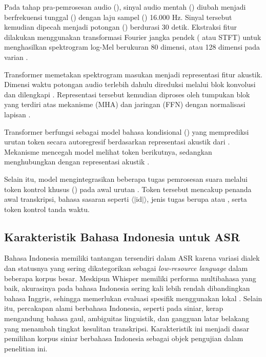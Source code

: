 Pada tahap pra-pemrosesan audio (), sinyal audio mentah () diubah menjadi berfrekuensi tunggal () dengan laju sampel () 16.000 Hz. Sinyal tersebut kemudian dipecah menjadi potongan () berdurasi 30 detik. Ekstraksi fitur dilakukan menggunakan transformasi Fourier jangka pendek ( atau STFT) untuk menghasilkan spektrogram log-Mel berukuran 80 dimensi, atau 128 dimensi pada varian .

 Transformer memetakan spektrogram masukan menjadi representasi fitur akustik. Dimensi waktu potongan audio terlebih dahulu direduksi melalui blok konvolusi dan dilengkapi . Representasi tersebut kemudian diproses oleh tumpukan blok  yang terdiri atas mekanisme  (MHA) dan jaringan  (FFN) dengan normalisasi lapisan .

 Transformer berfungsi sebagai model bahasa kondisional () yang memprediksi urutan token secara autoregresif berdasarkan representasi akustik dari . Mekanisme  mencegah model melihat token berikutnya, sedangkan  menghubungkan  dengan representasi akustik .

Selain itu, model  mengintegrasikan beberapa tugas pemrosesan suara melalui token kontrol khusus () pada awal urutan . Token tersebut mencakup penanda awal transkripsi, bahasa sasaran seperti $\langle|\text{id}|\rangle$, jenis tugas berupa  atau , serta token kontrol tanda waktu.

\subsection{Karakteristik Bahasa Indonesia untuk ASR}
Bahasa Indonesia memiliki tantangan tersendiri dalam ASR karena variasi dialek dan statusnya yang sering dikategorikan sebagai \textit{low-resource language} dalam beberapa korpus besar. Meskipun Whisper memiliki performa multibahasa yang baik, akurasinya pada bahasa Indonesia sering kali lebih rendah dibandingkan bahasa Inggris, sehingga memerlukan evaluasi spesifik menggunakan  lokal . Selain itu, percakapan alami berbahasa Indonesia, seperti pada siniar, kerap mengandung bahasa gaul, ambiguitas linguistik, dan gangguan latar belakang yang menambah tingkat kesulitan transkripsi. Karakteristik ini menjadi dasar pemilihan korpus siniar berbahasa Indonesia sebagai objek pengujian dalam penelitian ini.


